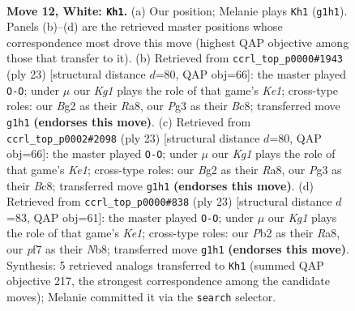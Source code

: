 \documentclass[11pt]{article}
\begin{document}
\clearpage

\begin{figure}[p]\centering
\begin{subfigure}{0.46\textwidth}\centering
\resizebox{\linewidth}{!}{%
\newchessgame
\chessboard[
  setfen={r1b1k2r/p1p1qpp1/2n2n2/3p3p/p2P4/2B2NP1/1P2PPBP/R2Q1RK1 w kq - 0 12},
  showmover=false,
  pgfstyle=straightmove, color=movearrow, markmove={g1-h1}
]}
\caption{}
\end{subfigure}\hfill
\begin{subfigure}{0.46\textwidth}\centering
\resizebox{\linewidth}{!}{%
\newchessgame
\chessboard[
  setfen={r1bqk2r/2p1npb1/p5pp/1p1pP3/3P4/2N2N2/PPB2PPP/R2QK2R b KQkq - 0 12},
  showmover=false,
  pgfstyle=straightmove, color=movearrow, markmove={e8-g8}
]}
\caption{}
\end{subfigure}
\\[4pt]
\begin{subfigure}{0.46\textwidth}\centering
\resizebox{\linewidth}{!}{%
\newchessgame
\chessboard[
  setfen={r1bqk2r/2p1npb1/p5pp/1p1pP3/3P4/2N2N2/PPB2PPP/R2QK2R b KQkq - 0 12},
  showmover=false,
  pgfstyle=straightmove, color=movearrow, markmove={e8-g8}
]}
\caption{}
\end{subfigure}\hfill
\begin{subfigure}{0.46\textwidth}\centering
\resizebox{\linewidth}{!}{%
\newchessgame
\chessboard[
  setfen={rn1qk2r/1b2bppp/p2p1n2/P1pP4/2B5/2N2N2/1P3PPP/R1BQK2R b KQkq - 4 12},
  showmover=false,
  pgfstyle=straightmove, color=movearrow, markmove={e8-g8}
]}
\caption{}
\end{subfigure}
\caption{\textbf{Move 12, White: \texttt{Kh1}.} (a) Our position; Melanie plays \texttt{Kh1} (\texttt{g1h1}). Panels (b)--(d) are the retrieved master positions whose correspondence most drove this move (highest QAP objective among those that transfer to it). (b) Retrieved from \texttt{ccrl\_top\_p0000\#1943} (ply 23) [structural distance $d$=80, QAP obj=66]: the master played \texttt{O-O}; under $\mu$ our \emph{Kg1} plays the role of that game's \emph{Ke1}; cross-type roles: our \emph{B}g2 as their \emph{R}a8, our \emph{P}g3 as their \emph{B}c8; transferred move \texttt{g1h1} \textbf{(endorses this move)}. (c) Retrieved from \texttt{ccrl\_top\_p0002\#2098} (ply 23) [structural distance $d$=80, QAP obj=66]: the master played \texttt{O-O}; under $\mu$ our \emph{Kg1} plays the role of that game's \emph{Ke1}; cross-type roles: our \emph{B}g2 as their \emph{R}a8, our \emph{P}g3 as their \emph{B}c8; transferred move \texttt{g1h1} \textbf{(endorses this move)}. (d) Retrieved from \texttt{ccrl\_top\_p0000\#838} (ply 23) [structural distance $d$=83, QAP obj=61]: the master played \texttt{O-O}; under $\mu$ our \emph{Kg1} plays the role of that game's \emph{Ke1}; cross-type roles: our \emph{P}b2 as their \emph{R}a8, our \emph{p}f7 as their \emph{N}b8; transferred move \texttt{g1h1} \textbf{(endorses this move)}. Synthesis: 5 retrieved analogs transferred to \texttt{Kh1} (summed QAP objective 217, the strongest correspondence among the candidate moves); Melanie committed it via the \texttt{search} selector.}
\label{fig:thought-m22}
\end{figure}
\end{document}
